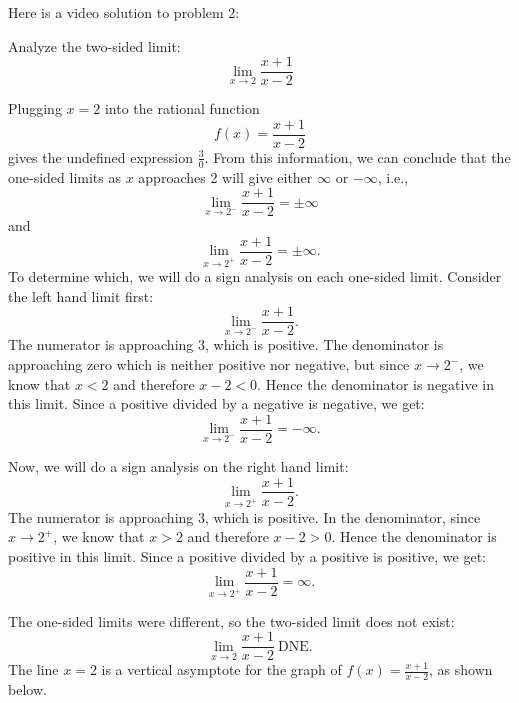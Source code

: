 \documentclass[handout]{ximera}
\begin{document}
Here is a video solution to problem 2:
\begin{foldable}
\end{foldable}

\begin{example}[example 3]

Analyze the two-sided limit:
\[
\lim_{x\to 2} 
\frac{x + 1}{x-2}
\]

Plugging $x = 2$ into the rational function
\[f(x) = \frac{x + 1}{x-2}\]
gives the undefined expression $\frac{3}{0}$. From this information, we can conclude that the 
one-sided limits as $x$ approaches 2
will give either $\infty$ or $-\infty$, i.e., 
\[\lim_{x \to 2^-} \frac{x+1}{x-2}= \pm \infty\]
and
\[\lim_{x \to 2^+} \frac{x+1}{x-2}= \pm \infty.\]
To determine which, we will do a sign analysis on each one-sided limit. Consider the left hand limit first:
\[\lim_{x \to 2^-} \frac{x+1}{x-2}.\]
The numerator is approaching 3, which is positive. The denominator is approaching zero which is neither 
positive nor negative, but since $x \to 2^-$, we know that $x<2$ and therefore $x-2 <0$.  
Hence the denominator is negative in this limit. Since a positive divided by a 
negative is negative, we get:
\[\lim_{x \to 2^-} \frac{x+1}{x-2}  = -\infty.\]

Now, we will do a sign analysis on the right hand limit:
\[\lim_{x \to 2^+} \frac{x+1}{x-2}.\]
The numerator is approaching 3, which is positive. In the denominator, since $x \to 2^+$, 
we know that $x>2$ and therefore $x-2 >0$.  
Hence the denominator is positive in this limit. Since a positive divided by a 
positive is positive, we get:
\[\lim_{x \to 2^+} \frac{x+1}{x-2} = \infty.\]

The one-sided limits were different, so the two-sided limit does not exist:
\[\lim_{x \to 2} \frac{x+1}{x-2} \ \text{DNE}.\]
The line $x = 2$ is a vertical asymptote for the graph of $f(x) = \frac{x+1}{x-2}$, as shown below.

\begin{center}
\end{center}
\end{example}
\end{document}
